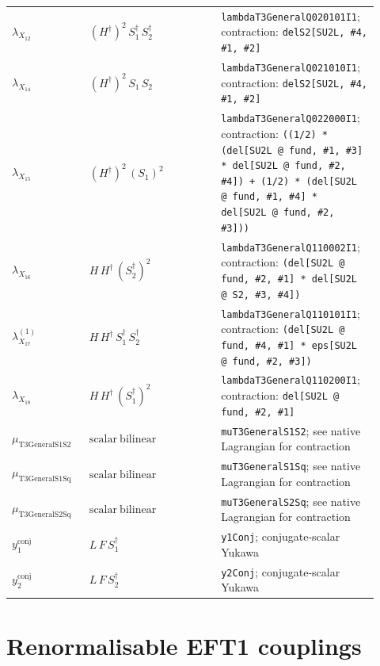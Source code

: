 \documentclass[8pt]{article}
\begin{document}
\begin{landscape}
\begin{longtable}{@{}p{0.20\linewidth}p{0.34\linewidth}p{0.38\linewidth}@{}}
$\lambda_{X_{12}}$ & $(H^\dagger)^{2}\,S_1^\dagger\,S_2^\dagger$ & \texttt{lambdaT3GeneralQ020101I1}; contraction: \texttt{delS2[SU2L, \#4, \#1, \#2]} \\
$\lambda_{X_{14}}$ & $(H^\dagger)^{2}\,S_1\,S_2$ & \texttt{lambdaT3GeneralQ021010I1}; contraction: \texttt{delS2[SU2L, \#4, \#1, \#2]} \\
$\lambda_{X_{15}}$ & $(H^\dagger)^{2}\,(S_1)^{2}$ & \texttt{lambdaT3GeneralQ022000I1}; contraction: \texttt{((1/2) * (del[SU2L @ fund, \#1, \#3] * del[SU2L @ fund, \#2, \#4]) + (1/2) * (del[SU2L @ fund, \#1, \#4] * del[SU2L @ fund, \#2, \#3]))} \\
$\lambda_{X_{16}}$ & $H\,H^\dagger\,(S_2^\dagger)^{2}$ & \texttt{lambdaT3GeneralQ110002I1}; contraction: \texttt{(del[SU2L @ fund, \#2, \#1] * del[SU2L @ S2, \#3, \#4])} \\
$\lambda_{X_{17}}^{(1)}$ & $H\,H^\dagger\,S_1^\dagger\,S_2^\dagger$ & \texttt{lambdaT3GeneralQ110101I1}; contraction: \texttt{(del[SU2L @ fund, \#4, \#1] * eps[SU2L @ fund, \#2, \#3])} \\
$\lambda_{X_{18}}$ & $H\,H^\dagger\,(S_1^\dagger)^{2}$ & \texttt{lambdaT3GeneralQ110200I1}; contraction: \texttt{del[SU2L @ fund, \#2, \#1]} \\
$\mu_{\mathrm{T3GeneralS1S2}}$ & $\mathrm{scalar\ bilinear}$ & \texttt{muT3GeneralS1S2}; see native Lagrangian for contraction \\
$\mu_{\mathrm{T3GeneralS1Sq}}$ & $\mathrm{scalar\ bilinear}$ & \texttt{muT3GeneralS1Sq}; see native Lagrangian for contraction \\
$\mu_{\mathrm{T3GeneralS2Sq}}$ & $\mathrm{scalar\ bilinear}$ & \texttt{muT3GeneralS2Sq}; see native Lagrangian for contraction \\
$y_{1}^{\mathrm{conj}}$ & $L\,F\,S_1^\dagger$ & \texttt{y1Conj}; conjugate-scalar Yukawa \\
$y_{2}^{\mathrm{conj}}$ & $L\,F\,S_2^\dagger$ & \texttt{y2Conj}; conjugate-scalar Yukawa \\
\bottomrule
\end{longtable}
\section*{Renormalisable EFT1 couplings}

\end{landscape}
\end{document}
